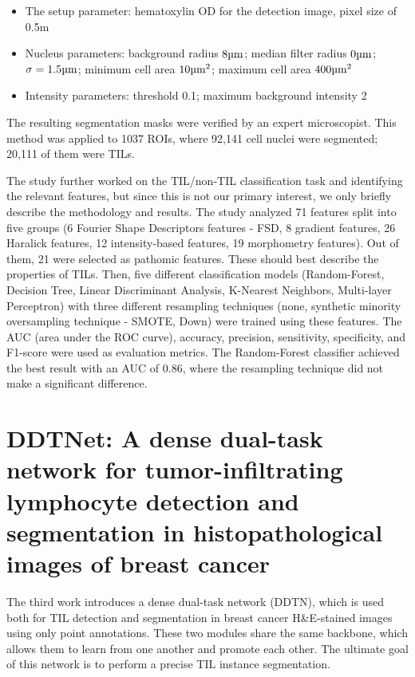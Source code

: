 \begin{itemize}
    \item The setup parameter: hematoxylin OD for the detection image, pixel size of 0.5\textmu m
    \item Nucleus parameters: background radius $8 \text{\textmu m}$; median filter radius $0 \text{\textmu m}$; $\sigma = 1.5 \text{\textmu m}$; minimum cell area $10 \text{\textmu m}^2$; maximum cell area $400 \text{\textmu m}^2$
    \item Intensity parameters: threshold 0.1; maximum background intensity 2
\end{itemize}

The resulting segmentation masks were verified by an expert microscopist. This method was applied to 1037 ROIs, where 92,141 cell nuclei were segmented; 20,111 of them were TILs.

The study further worked on the TIL/non-TIL classification task and identifying the relevant features, but since this is not our primary interest, we only briefly describe the methodology and results. The study analyzed 71 features split into five groups (6 Fourier Shape Descriptors features - FSD, 8 gradient features, 26 Haralick features, 12 intensity-based features, 19 morphometry features). Out of them, 21 were selected as pathomic features. These should best describe the properties of TILs. Then, five different classification models (Random-Forest, Decision Tree, Linear Discriminant Analysis, K-Nearest Neighbors, Multi-layer Perceptron) with three different resampling techniques (none, synthetic minority oversampling technique - SMOTE, Down) were trained using these features. The AUC (area under the ROC curve), accuracy, precision, sensitivity, specificity, and F1-score were used as evaluation metrics. The Random-Forest classifier achieved the best result with an AUC of 0.86, where the resampling technique did not make a significant difference.

\section{DDTNet: A dense dual-task network for tumor-infiltrating lymphocyte detection and segmentation in histopathological images of breast cancer \cite{Zhang2022}}
\label{section:related-3}

The third work introduces a dense dual-task network (DDTN), which is used both for TIL detection and segmentation in breast cancer H\&E-stained images using only point annotations. These two modules share the same backbone, which allows them to learn from one another and promote each other. The ultimate goal of this network is to perform a precise TIL instance segmentation.


